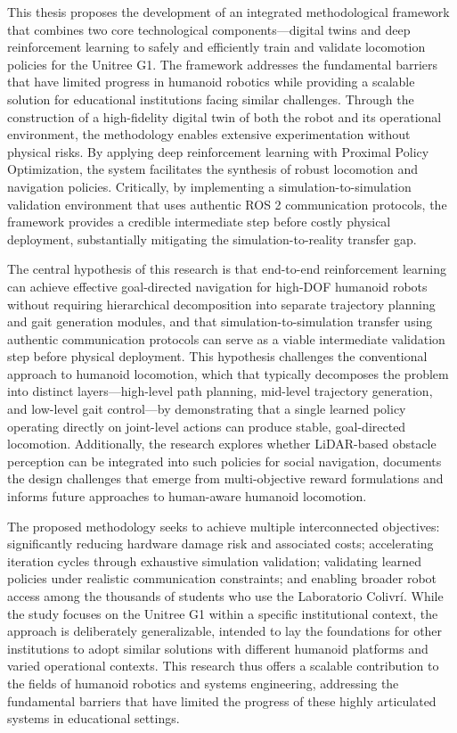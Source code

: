 \documentclass[12pt,a4paper]{article}
\begin{document}
This thesis proposes the development of an integrated methodological framework that combines two core technological components—digital twins and deep reinforcement learning to safely and efficiently train and validate locomotion policies for the Unitree G1. The framework addresses the fundamental barriers that have limited progress in humanoid robotics while providing a scalable solution for educational institutions facing similar challenges. Through the construction of a high-fidelity digital twin of both the robot and its operational environment, the methodology enables extensive experimentation without physical risks. By applying deep reinforcement learning with Proximal Policy Optimization, the system facilitates the synthesis of robust locomotion and navigation policies. Critically, by implementing a simulation-to-simulation validation environment that uses authentic ROS 2 communication protocols, the framework provides a credible intermediate step before costly physical deployment, substantially mitigating the simulation-to-reality transfer gap.

The central hypothesis of this research is that end-to-end reinforcement learning can achieve effective goal-directed navigation for high-DOF humanoid robots without requiring hierarchical decomposition into separate trajectory planning and gait generation modules, and that simulation-to-simulation transfer using authentic communication protocols can serve as a viable intermediate validation step before physical deployment. This hypothesis challenges the conventional approach to humanoid locomotion, which that typically decomposes the problem into distinct layers—high-level path planning, mid-level trajectory generation, and low-level gait control—by demonstrating that a single learned policy operating directly on joint-level actions can produce stable, goal-directed locomotion. Additionally, the research explores whether LiDAR-based obstacle perception can be integrated into such policies for social navigation, documents the design challenges that emerge from multi-objective reward formulations and informs future approaches to human-aware humanoid locomotion.

The proposed methodology seeks to achieve multiple interconnected objectives: significantly reducing hardware damage risk and associated costs; accelerating iteration cycles through exhaustive simulation validation; validating learned policies under realistic communication constraints; and enabling broader robot access among the thousands of students who use the Laboratorio Colivrí. While the study focuses on the Unitree G1 within a specific institutional context, the approach is deliberately generalizable, intended to lay the foundations for other institutions to adopt similar solutions with different humanoid platforms and varied operational contexts. This research thus offers a scalable contribution to the fields of humanoid robotics and systems engineering, addressing the fundamental barriers that have limited the progress of these highly articulated systems in educational settings.
\end{document}
